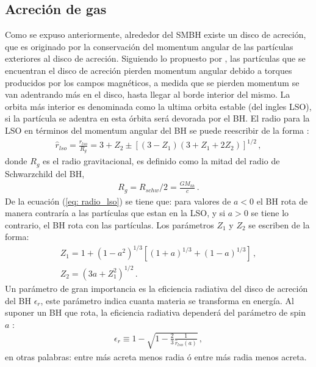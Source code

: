 \subsection{Acreción de gas}
\label{subsec: Acrecion_gas}
Como se expuso anteriormente, alrededor del SMBH existe un disco de acreción, que es originado por la conservación del momentum angular de las partículas exteriores al disco de acreción. Siguiendo lo propuesto por \cite{lynden1969}, las partículas que se encuentran el disco de acreción pierden momentum angular debido a torques producidos por los campos magnéticos, a medida que se pierden momentum se van adentrando más en el disco, hasta llegar al borde interior del mismo. La orbita más interior es denominada como la ultima orbita estable (del ingles LSO), si la partícula se adentra en esta órbita será devorada por el BH. El radio para la LSO en términos del momentum angular del BH se puede reescribir de la forma \cite{bardeen1972}:
%
\begin{align}
 \hat{r}_{lso}=\frac{r_{lso}}{R_g}=3+Z_{2}\pm \left[ (3-Z_{1})(3+Z_{1}+2Z_{2})\right]^{1/2} \,,
 \label{eq: radio_lso}
\end{align}
%
donde $R_{g}$ es el radio gravitacional, es definido como la mitad del radio de Schwarzchild del BH, 
%
\begin{align}
    R_{g}= R_{schw}/2  = \frac{GM_{bh}}{c}\,.
\end{align}
%
De la ecuación (\ref{eq: radio_lso}) se tiene que: para valores de $a<0$ el BH rota de manera contraría a las partículas que estan en la LSO, y si $a>0$ se tiene lo contrario, el BH rota con las partículas. Los parámetros $Z_1$ y $Z_2$ se escriben de la forma:
%
\begin{eqnarray}
    Z_1 = 1+(1-a^{2})^{1/3}\left[(1+a)^{1/3}+(1-a)^{1/3} \right]\,,\\
    Z_2 = (3a+Z_{1}^{2})^{1/2}\,.
\end{eqnarray}
%
Un parámetro de gran importancia es la eficiencia radiativa del disco de acreción del BH $\epsilon_{r}$, este parámetro indica cuanta materia se transforma en energía. Al suponer un BH que rota, la eficiencia radiativa dependerá del parámetro de spin $a$ \cite{novikov1973}:
%
\begin{align}
    \epsilon_{r} \equiv 1- \sqrt{1-\frac{2}{3}\frac{1}{\hat{r}_{lso}(a)}}\,,
\end{align}
\label{eq: eficiencia radiativa}
%
en otras palabras: entre más acreta menos radia ó entre más radia menos acreta.

